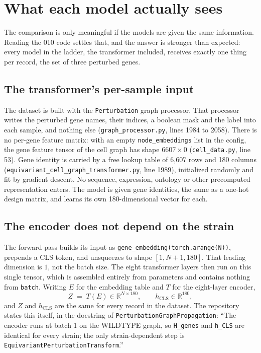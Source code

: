 
\section{What each model actually sees}
\label{sec:sees}

The comparison is only meaningful if the models are given the same information.
Reading the 010 code settles that, and the answer is stronger than expected: every
model in the ladder, the transformer included, receives exactly one thing per
record, the set of three perturbed genes.

\subsection{The transformer's per-sample input}

The dataset is built with the \texttt{Perturbation} graph processor. That processor
writes the perturbed gene names, their indices, a boolean mask and the label into
each sample, and nothing else (\texttt{graph\_processor.py}, lines 1984 to 2058).
There is no per-gene feature matrix: with an empty \texttt{node\_embeddings} list
in the config, the gene feature tensor of the cell graph has shape $6607 \times 0$
(\texttt{cell\_data.py}, line 53). Gene identity is carried by a free lookup table
of 6{,}607 rows and 180 columns
(\texttt{equivariant\_cell\_graph\_transformer.py}, line 1989), initialized randomly
and fit by gradient descent. No sequence, expression, ontology or other precomputed
representation enters. The model is given gene identities, the same as a one-hot
design matrix, and learns its own 180-dimensional vector for each.

\subsection{The encoder does not depend on the strain}
\label{sec:encoder}

The forward pass builds its input as \texttt{gene\_embedding(torch.arange(N))},
prepends a CLS token, and unsqueezes to shape $[1, N{+}1, 180]$. That leading
dimension is $1$, not the batch size. The eight transformer layers then run on this
single tensor, which is assembled entirely from parameters and contains nothing
from \texttt{batch}. Writing $E$ for the embedding table and $T$ for the
eight-layer encoder,
%
\begin{equation}
  Z \;=\; T(E) \in \mathbb{R}^{N \times 180},
  \qquad
  h_{\mathrm{CLS}} \in \mathbb{R}^{180},
  \label{eq:encoder}
\end{equation}
%
and $Z$ and $h_{\mathrm{CLS}}$ are the same for every record in the dataset. The
repository states this itself, in the docstring of
\texttt{PerturbationGraphPropagation}: ``The encoder runs at batch 1 on the
WILDTYPE graph, so \texttt{H\_genes} and \texttt{h\_CLS} are identical for every
strain; the only strain-dependent step is
\texttt{EquivariantPerturbationTransform}.''


